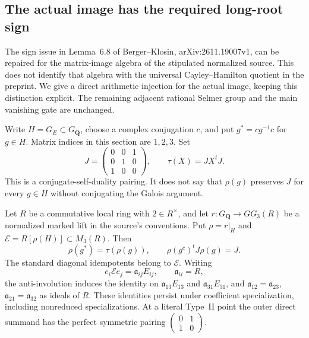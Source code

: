 \subsection{The actual image has the required long-root sign}
\label{sec:kt-actual-image-polarization}

The sign issue in Lemma~6.8 of Berger--Klosin,
arXiv:2611.19007v1, can be repaired for the matrix-image algebra
of the stipulated normalized source.  This does not identify that
algebra with the universal Cayley--Hamilton quotient in the
preprint.  We give a direct arithmetic injection for the actual
image, keeping this distinction explicit.  The remaining adjacent
rational Selmer group and the main vanishing gate are unchanged.

Write $H=G_E\subset G_{\mathbf Q}$, choose a complex conjugation
$c$, and put $g^*=cg^{-1}c$ for $g\in H$.  Matrix indices in this
section are $1,2,3$.  Set
\[
 J=\begin{pmatrix}0&0&1\\0&1&0\\1&0&0\end{pmatrix},\qquad
 \tau(X)=JX^tJ.                                               \tag{AP.1}
\]
This is a conjugate-self-duality pairing.  It does not say that
$\rho(g)$ preserves $J$ for every $g\in H$ without conjugating
the Galois argument.

\begin{lemma}
Let $R$ be a commutative local ring with $2\in R^\times$, and
let $r:G_{\mathbf Q}\to GG_3(R)$ be a normalized marked lift
in the source's conventions.  Put $\rho=r|_H$ and
$\mathcal E=R[\rho(H)]\subset M_3(R)$.  Then
\[
 \rho(g^*)=\tau(\rho(g)),\qquad
 \rho(g^c)^tJ\rho(g)=J.                                     \tag{AP.2}
\]
The standard diagonal idempotents belong to $\mathcal E$.
Writing
\[
 e_i\mathcal E e_j=\mathfrak a_{ij}E_{ij},\qquad
 \mathfrak a_{ii}=R,                                        \tag{AP.3}
\]
the anti-involution induces the identity on
$\mathfrak a_{13}E_{13}$ and $\mathfrak a_{31}E_{31}$, and
$\mathfrak a_{12}=\mathfrak a_{23}$,
$\mathfrak a_{21}=\mathfrak a_{32}$ as ideals of $R$.
These identities persist under coefficient specialization,
including nonreduced specializations.  At a literal Type~II
point the outer direct summand has the perfect symmetric
pairing $\left(\begin{smallmatrix}0&1\\1&0\end{smallmatrix}\right)$.
\end{lemma}

